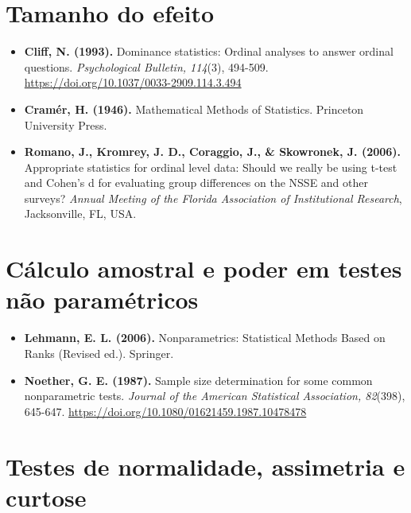 \documentclass[
]{book}
\begin{document}
\section*{Tamanho do efeito}\label{tamanho-do-efeito-1}

\begin{itemize}
\item
  \textbf{Cliff, N. (1993).} Dominance statistics: Ordinal analyses to answer ordinal questions. \emph{Psychological Bulletin, 114}(3), 494-509. \url{https://doi.org/10.1037/0033-2909.114.3.494}
\item
  \textbf{Cramér, H. (1946).} Mathematical Methods of Statistics. Princeton University Press.
\item
  \textbf{Romano, J., Kromrey, J. D., Coraggio, J., \& Skowronek, J. (2006).} Appropriate statistics for ordinal level data: Should we really be using t-test and Cohen's d for evaluating group differences on the NSSE and other surveys? \emph{Annual Meeting of the Florida Association of Institutional Research}, Jacksonville, FL, USA.
\end{itemize}

\section*{Cálculo amostral e poder em testes não paramétricos}\label{cuxe1lculo-amostral-e-poder-em-testes-nuxe3o-paramuxe9tricos}

\begin{itemize}
\item
  \textbf{Lehmann, E. L. (2006).} Nonparametrics: Statistical Methods Based on Ranks (Revised ed.). Springer.
\item
  \textbf{Noether, G. E. (1987).} Sample size determination for some common nonparametric tests. \emph{Journal of the American Statistical Association, 82}(398), 645-647. \url{https://doi.org/10.1080/01621459.1987.10478478}
\end{itemize}

\section*{Testes de normalidade, assimetria e curtose}\label{testes-de-normalidade-assimetria-e-curtose}
\end{document}
